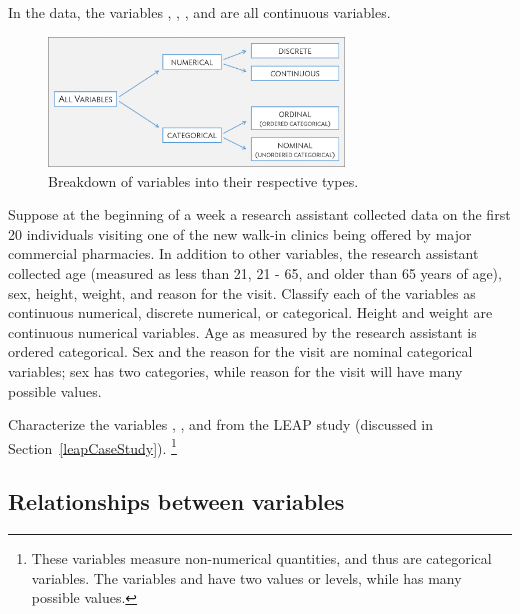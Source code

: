 \begin{doublespace}
In the  data, the variables , , , and  are all continuous variables. 

\begin{figure}
\centering
\includegraphics[width=0.70\textwidth]{ch_intro_to_data_oi_biostat/figures/variables/variableTypes.png}
\caption{Breakdown of variables into their respective types.}
\label{variableTypes}
\end{figure}

\begin{example}{Suppose at the beginning of a week a research assistant collected data on the first 20 individuals visiting one of the new walk-in clinics being offered by major commercial pharmacies.  In addition to other variables, the research assistant collected age (measured as less than 21, 21 - 65, and older than 65 years of age), sex, height, weight, and reason for the visit.  Classify each of the variables as continuous numerical, discrete numerical, or categorical.}
Height and weight are continuous numerical variables. Age as measured by the research assistant is ordered categorical. Sex and the reason for the visit are nominal categorical variables; sex has two categories, while reason for the visit will have many possible values. 
\end{example}


\begin{exercise} 
Characterize the variables , , and  from the LEAP study (discussed in Section~\ref{leapCaseStudy}). \footnote{These variables measure non-numerical quantities, and thus are categorical variables. The variables   and  have two values or levels, while  has many possible values.}
\end{exercise}

\subsection{Relationships between variables}
\label{variableRelations}


\end{doublespace}
